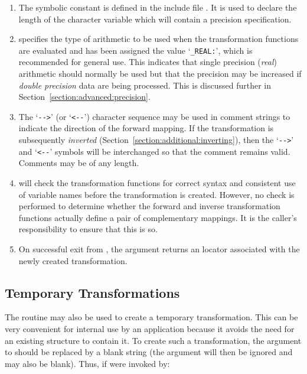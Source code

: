 \begin{enumerate}

\item The symbolic constant  is defined in the include
file . 
It is used to declare the length of the character variable 
which will contain a precision specification. 

\item {} specifies the type of arithmetic to be used when the
transformation functions are evaluated and has been assigned the value
`\verb#_REAL:#', which is recommended for general use.
This indicates that single precision ({\em real}) arithmetic should normally
be used but that the precision may be increased if {\em double precision}
data are being processed. 
This is discussed further in Section~\ref{section:advanced:precision}. 

\item The `\verb#-->#' (or `\verb#<--#') character sequence may be used in
comment strings to indicate the direction of the forward mapping. 
If the transformation is subsequently {\em inverted}
(Section~\ref{section:additional:inverting}), then the `\verb#-->#' and
`\verb#<--#' symbols will be interchanged so that the comment remains valid.
Comments may be of any length.

\item {} will check the transformation functions for correct
syntax and consistent use of variable names before the transformation is
created.
However, no check is performed to determine whether the forward and inverse
transformation functions actually define a pair of complementary mappings. 
It is the caller's responsibility to ensure that this is so.

\item On successful exit from , the  argument
returns an  locator associated with the newly created
transformation. 

\end{enumerate}
\exampledone


\subsection{Temporary Transformations}

\label{section:simple:temporary}

The  routine may also be used to create a temporary
transformation.
This can be very convenient for internal use by an application because it
avoids the need for an existing  structure to contain it. 
To create such a transformation, the  argument to
 should be replaced by a blank string (the 
argument will then be ignored and may also be blank). 
Thus, if  were invoked by:

